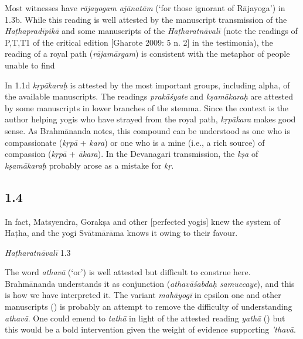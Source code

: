 \begin{ekdosis}
\begin{philcomm}[hp01_003] 
Most witnesses have \emph{rājayogam ajānatām} (`for those ignorant of Rājayoga') in 1.3b. While this reading is well attested by the manuscript transmission of the \emph{Haṭhapradīpikā} and some manuscripts of the \emph{Haṭharatnāvalī} (note the readings of P,T,T1 of the critical edition [Gharote 2009: 5 n. 2] in the testimonia), the reading of a royal path (\emph{rājamārgam}) is consistent with the metaphor of people unable to find%

In 1.1d \emph{kṛpākaraḥ} is attested by the most important groups, including alpha, of the available manuscripts. The readings \emph{prakāśyate} and \emph{kṣamākaraḥ} are attested by some manuscripts in lower branches of the stemma. Since the context is the author helping yogis who have strayed from the royal path, \emph{kṛpākara} makes good sense. As Brahmānanda notes, this compound can be understood as one who is compassionate (\emph{kṛpā} + \emph{kara}) or one who is a mine (i.e., a rich source) of compassion (\emph{kṛpā} + \emph{ākara}). In the Devanagari transmission, the \emph{kṣa} of \emph{kṣamākaraḥ} probably arose as a mistake for \emph{kṛ}.       
\end{philcomm}

\subsection*{1.4}
\begin{translation}[hp01_004]
In fact, Matsyendra, Gorakṣa and other [perfected yogis] knew the system of Haṭha, and the yogi Svātmārāma knows it owing to their favour.%
\end{translation}

\begin{testimonia}[hp01_004]
\emph{Haṭharatnāvalī} 1.3

\begin{versinnote}
\end{versinnote}

\end{testimonia}

\begin{philcomm}[hp01_004]   
The word \emph{athavā} (‘or’) is well attested but difficult to construe here. Brahmānanda understands it as conjunction (\emph{athavāśabdaḥ samuccaye}), and this is how we have interpreted it. The variant \emph{mahāyogī} in epsilon one and other manuscripts () is probably an attempt to remove the difficulty of understanding \emph{athavā}. One could emend to \emph{tathā} in light of the attested reading \emph{yathā} () but this would be a bold intervention given the weight of evidence supporting \emph{’thavā}.   
\end{philcomm}


\end{ekdosis}
